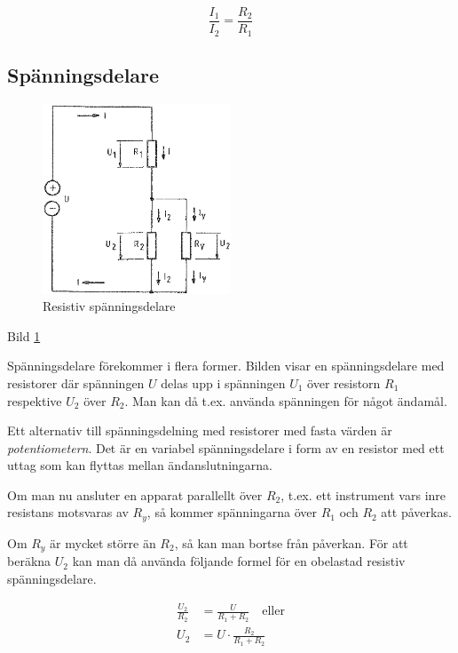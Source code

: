 \[\frac{I_1}{I_2} = \frac{R_2}{R_1}\]

\subsection{Spänningsdelare}

\begin{figure}
\includegraphics[width=0.5\textwidth]{images/bild_2_3-03.png}
\caption{Resistiv spänningsdelare}
\label{fig:BildII3-03}
\end{figure}

Bild \ref{fig:BildII3-03}

Spänningsdelare förekommer i flera former. Bilden visar en spänningsdelare med
resistorer där spänningen \(U\) delas upp i spänningen \(U_1\) över resistorn
\(R_1\) respektive \(U_2\) över \(R_2\). Man kan då t.ex. använda spänningen för
något ändamål.

Ett alternativ till spänningsdelning med resistorer med fasta värden är
\emph{potentiometern}. Det är en variabel spänningsdelare i form av en resistor
med ett uttag som kan flyttas mellan ändanslutningarna.

Om man nu ansluter en apparat parallellt över \(R_2\), t.ex. ett instrument
vars inre resistans motsvaras av \(R_y\), så kommer spänningarna över \(R_1\)
och \(R_2\) att påverkas.

Om \(R_y\) är mycket större än \(R_2\), så kan man bortse från påverkan.
För att beräkna \(U_2\) kan man då använda följande formel för en obelastad
resistiv spänningsdelare.

\begin{align*}
\frac{U_2}{R_2} &= \frac{U}{R_1 + R_2} \quad \text{eller} \\
U_2 &= U \cdot \frac{R_2}{R_1 + R_2}
\end{align*}

